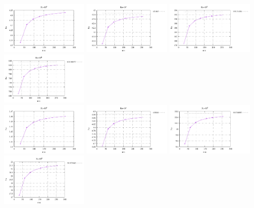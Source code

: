 \begin{center}
\includegraphics[width=4.297cm]{python_codes/fieldstone_155/results_SS/vrms1000}
\includegraphics[width=4.297cm]{python_codes/fieldstone_155/results_SS/vrms10000}
\includegraphics[width=4.297cm]{python_codes/fieldstone_155/results_SS/vrms100000}
\includegraphics[width=4.297cm]{python_codes/fieldstone_155/results_SS/vrms1000000}\\
\includegraphics[width=4.297cm]{python_codes/fieldstone_155/results_SS/Nu1000}
\includegraphics[width=4.297cm]{python_codes/fieldstone_155/results_SS/Nu10000}
\includegraphics[width=4.297cm]{python_codes/fieldstone_155/results_SS/Nu100000}
\includegraphics[width=4.297cm]{python_codes/fieldstone_155/results_SS/Nu1000000}
\end{center}




